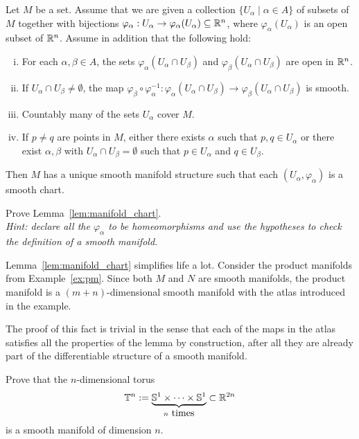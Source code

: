 \begin{lemma}\label{lem:manifold_chart}
	Let $M$ be a set. Assume that we are given a collection $\{U_\alpha\mid \alpha\in A\}$ of subsets of $M$ together with bijections $\varphi_\alpha: U_\alpha\to\varphi_\alpha(U_\alpha)\subseteq\mathbb{R}^n$, where $\varphi_\alpha(U_\alpha)$ is an open subset of $\mathbb{R}^n$. Assume in addition that the following hold:
	\begin{enumerate}[(i)]
		\item For each $\alpha, \beta \in A$, the sets $\varphi_\alpha(U_\alpha \cap U_\beta)$ and $\varphi_\beta(U_\alpha \cap U_\beta)$ are open in $\mathbb{R}^n$.
		\item If $U_\alpha \cap U_\beta \neq \emptyset$, the map $\varphi_\beta\circ\varphi_\alpha^{-1}: \varphi_\alpha(U_\alpha \cap U_\beta)\to \varphi_\beta(U_\alpha \cap U_\beta)$ is smooth.
		\item Countably many of the sets $U_\alpha$ cover $M$.
		\item If $p\neq q$ are points in $M$, either there exists $\alpha$ such that $p,q\in U_\alpha$ or there exist $\alpha,\beta$ with $U_\alpha\cap U_\beta=\emptyset$ such that $p\in U_\alpha$ and $q\in U_\beta$.
	\end{enumerate}
	Then $M$ has a unique smooth manifold structure such that each $(U_\alpha,\varphi_\alpha)$ is a smooth chart.
\end{lemma}
\begin{exercise}
	Prove Lemma~\ref{lem:manifold_chart}.\\
	\textit{\small Hint: declare all the $\varphi_\alpha$ to be homeomorphisms and use the hypotheses to check the definition of a smooth manifold.}
\end{exercise}

\begin{example}
	Lemma~\ref{lem:manifold_chart} simplifies life a lot.
	Consider the product manifolds from Example~\ref{ex:pm}.
	Since both $M$ and $N$ are smooth manifolds, the product manifold is a $(m+n)$-dimensional smooth manifold with the atlas introduced in the example.

	The proof of this fact is trivial in the sense that each of the maps in the atlas satisfies all the properties of the lemma by construction, after all they are already part of the differentiable structure of a smooth manifold.
\end{example}

\begin{exercise}
	Prove that the $n$-dimensional torus
	\begin{equation}
		\bT^n := \LaTeXunderbrace{\bS^1\times\cdots\times\bS^1}_{n\mbox{ times}} \subset \R^{2n}
	\end{equation}
	is a smooth manifold of dimension $n$.
\end{exercise}


